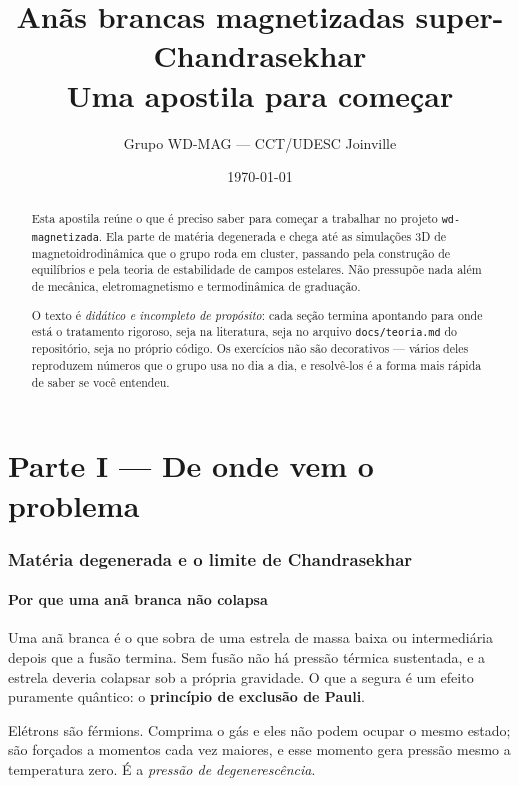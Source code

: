 \documentclass[11pt,a4paper]{article}
\title{\bf Anãs brancas magnetizadas super-Chandrasekhar\\
\large Uma apostila para começar}
\author{Grupo WD-MAG --- CCT/UDESC Joinville}
\date{\today}
\newcommand{\code}[1]{\texttt{\small #1}}
\newcounter{exerc}[section]
\begin{document}
\maketitle

\begin{abstract}
\noindent
Esta apostila reúne o que é preciso saber para começar a trabalhar no projeto
\code{wd-magnetizada}. Ela parte de matéria degenerada e chega até as
simulações 3D de magnetoidrodinâmica que o grupo roda em cluster, passando pela
construção de equilíbrios e pela teoria de estabilidade de campos estelares.
Não pressupõe nada além de mecânica, eletromagnetismo e termodinâmica de
graduação.

O texto é \emph{didático e incompleto de propósito}: cada seção termina
apontando para onde está o tratamento rigoroso, seja na literatura, seja no
arquivo \code{docs/teoria.md} do repositório, seja no próprio código. Os
exercícios não são decorativos --- vários deles reproduzem números que o grupo
usa no dia a dia, e resolvê-los é a forma mais rápida de saber se você entendeu.
\end{abstract}

\tableofcontents
\newpage

\part*{Parte I --- De onde vem o problema}

\section{Matéria degenerada e o limite de Chandrasekhar}

\subsection{Por que uma anã branca não colapsa}

Uma anã branca é o que sobra de uma estrela de massa baixa ou intermediária
depois que a fusão termina. Sem fusão não há pressão térmica sustentada, e a
estrela deveria colapsar sob a própria gravidade. O que a segura é um efeito
puramente quântico: o \textbf{princípio de exclusão de Pauli}.

Elétrons são férmions. Comprima o gás e eles não podem ocupar o mesmo estado;
são forçados a momentos cada vez maiores, e esse momento gera pressão mesmo a
temperatura zero. É a \emph{pressão de degenerescência}.
\end{document}
